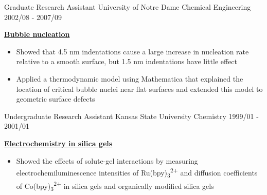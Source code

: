 \begin{cventries}
  \cventry
    {Graduate Research Assistant} %
    {University of Notre Dame} %
    {Chemical Engineering} %
    {2002/08 - 2007/09} %
    {
      \begin{cvitems} %
        \item {\textbf{\underline{Bubble nucleation}}}
            \begin{itemize}
                \item {Showed that 4.5 nm indentations cause a large increase in nucleation rate relative to a smooth surface, but 1.5 nm indentations have little effect}
                \item {Applied a thermodynamic model using Mathematica that explained the location of critical bubble nuclei near flat surfaces and extended this model to geometric surface defects}
            \end{itemize}
      \end{cvitems}
    }
    
  \cventry
    {Undergraduate Research Assistant} %
    {Kansas State University} %
    {Chemistry} %
    {1999/01 - 2001/01} %
    {
      \begin{cvitems} %
        \item {\textbf{\underline{Electrochemistry in silica gels}}}
            \begin{itemize}
                \item {Showed the effects of solute-gel interactions by measuring electrochemiluminescence intensities of Ru(bpy)\textsubscript{3}\textsuperscript{2+} and diffusion coefficients of Co(bpy)\textsubscript{3}\textsuperscript{2+} in silica gels and organically modified silica gels}
            \end{itemize}
      \end{cvitems}
    }
    
\end{cventries}
